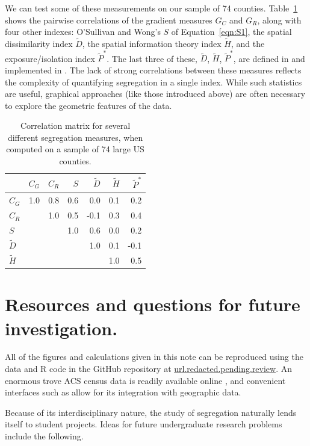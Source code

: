 \documentclass{article}
\theoremstyle{theorem}
\theoremstyle{definition}
\begin{document}
We can test some of these measurements on our sample of 74 counties. Table~\ref{tab:indexcor} shows the pairwise correlations of the gradient measures $G_C$ and $G_R$, along with four other indexes: O'Sullivan and Wong's $S$ of Equation~\ref{eqn:S1}, the spatial dissimilarity index $\tilde{D}$, the spatial information theory index $\tilde{H}$, and the exposure/isolation index $\tilde{P}^*$. The last three of these, $\tilde{D}$, $\tilde{H}$, $\tilde{P}^*$, are defined in \cite{reardonosullivan04} and implemented in \cite{hong14}. The lack of strong correlations between these measures reflects the complexity of quantifying segregation in a single index. While such statistics are useful, graphical approaches (like those introduced above) are often necessary to explore the geometric features of the data.

\begin{table}[bt]
\centering
\begin{tabular}{l|rrrrrr} %
   & $C_G$ & $C_R$ & $S$ & $\tilde{D}$ &  $\tilde{H}$ & $\tilde{P}^*$ \\
  \hline
  $C_G$ & 1.0 & 0.8 & 0.6 & 0.0 & 0.1 & 0.2 \\
  $C_R$ &  & 1.0 & 0.5 & -0.1 & 0.3 & 0.4 \\
  $S$ &  &  & 1.0 & 0.6 & 0.0 & 0.2 \\
  $\tilde{D}$ &  &  &  & 1.0 & 0.1 & -0.1 \\
  $\tilde{H}$ &  &  &  &  & 1.0 & 0.5 \\
\end{tabular}
\caption{Correlation matrix for several different segregation measures, when computed on a sample of 74 large US counties.}
\label{tab:indexcor}
\end{table}


\section{Resources and questions for future investigation.}

All of the figures and calculations given in this note can be reproduced using the data and R code in the GitHub repository at
\url{url.redacted.pending.review}. An enormous trove ACS census data is readily available online \cite{acs19}, and convenient interfaces such as \cite{walker19} allow for its integration with geographic data.

Because of its interdisciplinary nature, the study of segregation naturally lends itself to student projects. Ideas for future undergraduate research problems include the following.
\end{document}
